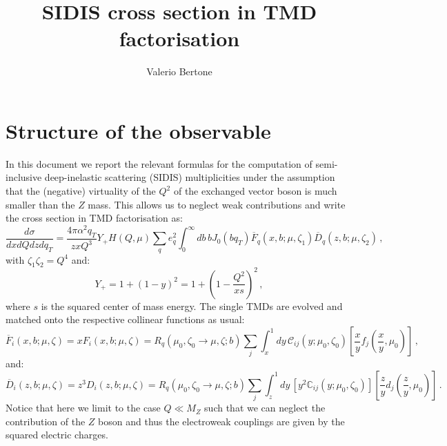 \documentclass[10pt,a4paper]{article}
\begin{document}
\title{SIDIS cross section in TMD factorisation}

\author{Valerio Bertone}

\maketitle

\tableofcontents{}

\section{Structure of the observable}

In this document we report the relevant formulas for the computation
of semi-inclusive deep-inelastic scattering (SIDIS) multiplicities
under the assumption that the (negative) virtuality of the $Q^2$ of
the exchanged vector boson is much smaller than the $Z$ mass. This
allows us to neglect weak contributions and write the cross section
in TMD factorisation as:
\begin{equation}\label{eq:sidisxsec}
  \frac{d\sigma}{dxdQdz d q_T} = \frac{4\pi \alpha^2q_T}{z x Q^3}Y_+ H(Q,\mu) \sum_q e_q^2
  \int_0^\infty db \,b J_0\left(bq_T\right)\overline{F}_q(x,b;\mu,\zeta_1) \overline{D}_{q}(z,b;\mu,\zeta_2)\,,
\end{equation}
with $\zeta_1\zeta_2=Q^4$ and:
\begin{equation}
  Y_+=1+(1-y)^2=1+\left(1-\frac{Q^2}{xs}\right)^2\,,
\end{equation}
where $s$ is the squared center of mass energy. The single TMDs are
evolved and matched onto the respective collinear functions as usual:
\begin{equation}
\overline{F}_i(x,b;\mu,\zeta) =xF_i(x,b;\mu,\zeta) = R_q(\mu_0,\zeta_0\rightarrow \mu,\zeta;b) \sum_{j}\int_x^1dy\,\mathcal{C}_{ij}(y;\mu_0,\zeta_0)\left[\frac{x}{y}f_j\left(\frac{x}{y},\mu_0\right)\right]\,,
\end{equation}
and:
\begin{equation}
\overline{D}_{i}(z,b;\mu,\zeta) =z^3D_{i}(z,b;\mu,\zeta) = R_q(\mu_0,\zeta_0\rightarrow \mu,\zeta;b) \sum_{j}\int_z^1dy\,\left[y^2\mathbb{C}_{ij}(y;\mu_0,\zeta_0)\right]\left[\frac{z}{y}d_j\left(\frac{z}{y},\mu_0\right)\right]\,.
\end{equation}
Notice that here we limit to the case $Q\ll M_Z$ such that we can
neglect the contribution of the $Z$ boson and thus the electroweak
couplings are given by the squared electric charges.
\end{document}
